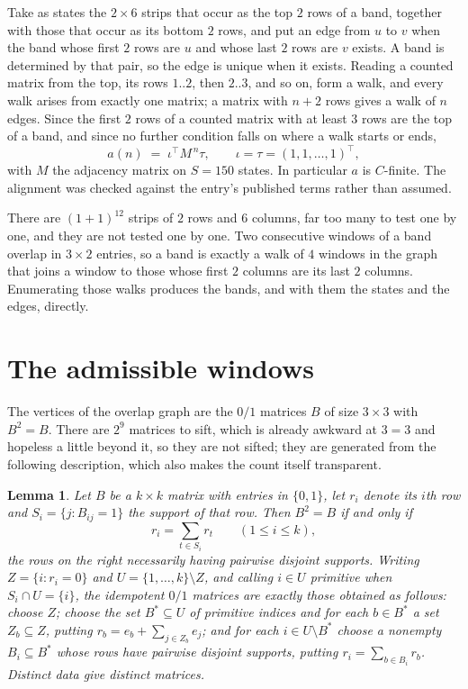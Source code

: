 \documentclass[11pt,a4paper]{article}
\theoremstyle{plain}
\newtheorem{lemma}[theorem]{Lemma}
\theoremstyle{definition}
\begin{document}
Take as states the $2\times6$ strips that occur as the top $2$ rows of a band,
together with those that occur as its bottom $2$ rows, and put an edge from $u$ to $v$
when the band whose first $2$ rows are $u$ and whose last $2$ rows are $v$ exists.
A band is determined by that pair, so the edge is unique when it exists. Reading a counted
matrix from the top, its rows $1..2$, then $2..3$, and so on, form a walk, and every
walk arises from exactly one matrix; a matrix with $n+2$ rows gives a walk of $n$ edges.
Since the first $2$ rows of a counted matrix with at least $3$ rows are the top of a
band, and since no further condition falls on where a walk starts or ends,
\[
a(n)\;=\;\iota^{\!\top}M^{\,n}\tau ,\qquad \iota=\tau=(1,1,\dots,1)^{\!\top},
\]
with $M$ the adjacency matrix on $S=150$ states. In particular $a$ is $C$-finite. The
alignment was checked against the entry's published terms rather than assumed.

There are $(1 + 1)^{12}$ strips of $2$ rows and $6$ columns, far too
many to test one by one, and they are not tested one by one. Two consecutive windows of a band
overlap in $3\times2$ entries, so a band is exactly a walk of $4$ windows in
the graph that joins a window to those whose first $2$ columns are its last $2$
columns. Enumerating those walks produces the bands, and with them the states and the edges,
directly.

\section{The admissible windows}

The vertices of the overlap graph are the $0/1$ matrices $B$ of size $3\times3$ with
$B^2=B$. There are $2^{9}$ matrices to sift, which is already awkward at $3=3$ and
hopeless a little beyond it, so they are not sifted; they are generated from the following
description, which also makes the count itself transparent.

\begin{lemma}\label{lem:idem}
Let $B$ be a $k\times k$ matrix with entries in $\{0,1\}$, let $r_i$ denote its $i$th row and
$S_i=\{j:B_{ij}=1\}$ the support of that row. Then $B^2=B$ if and only if
\[
r_i=\sum_{t\in S_i}r_t \qquad (1\le i\le k),
\]
the rows on the right necessarily having pairwise disjoint supports. Writing
$Z=\{i:r_i=0\}$ and $U=\{1,\dots,k\}\setminus Z$, and calling $i\in U$ \emph{primitive}
when $S_i\cap U=\{i\}$, the idempotent $0/1$ matrices are exactly those obtained as follows:
choose $Z$; choose the set $B^{\ast}\subseteq U$ of primitive indices and for each
$b\in B^{\ast}$ a set $Z_b\subseteq Z$, putting $r_b=e_b+\sum_{j\in Z_b}e_j$; and for each
$i\in U\setminus B^{\ast}$ choose a nonempty $B_i\subseteq B^{\ast}$ whose rows have
pairwise disjoint supports, putting $r_i=\sum_{b\in B_i}r_b$. Distinct data give distinct
matrices.
\end{lemma}
\end{document}
